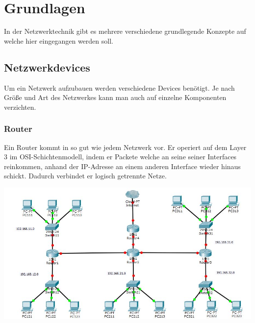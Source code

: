\documentclass[11pt,a4paper]{report}
\begin{document}
\section{Grundlagen}
In der Netzwerktechnik gibt es mehrere verschiedene grundlegende Konzepte auf welche hier eingegangen werden soll.
\subsection{Netzwerkdevices}
Um ein Netzwerk aufzubauen werden verschiedene Devices benötigt. Je nach Größe und Art des Netzwerkes kann man auch auf einzelne Komponenten verzichten. 
\subsubsection{Router}
Ein Router kommt in so gut wie jedem Netzwerk vor. Er operiert auf dem Layer 3 im OSI-Schichtenmodell, indem er Packete welche an seine seiner Interfaces reinkommen, anhand der IP-Adresse an einem anderen Interface wieder hinaus schickt. Dadurch verbindet er logisch getrennte Netze.\\

\begin{center}
\includegraphics[scale=0.5]{../docs/tarkes/pics/RouterNetwork.jpg}\label{fig:bspNetwork}
\end{center}
\end{document}
